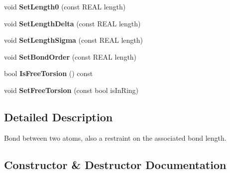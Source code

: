 \begin{DoxyCompactItemize}
void {\bfseries Set\+Length0} (const R\+E\+AL length)
\item 
\mbox{\label{class_obj_cryst_1_1_mol_bond_a42e9a07e2383dcfdcb5b7f0728be726f}} 
void {\bfseries Set\+Length\+Delta} (const R\+E\+AL length)
\item 
\mbox{\label{class_obj_cryst_1_1_mol_bond_ab96f037ddc070774b0cb9665e4e1b751}} 
void {\bfseries Set\+Length\+Sigma} (const R\+E\+AL length)
\item 
\mbox{\label{class_obj_cryst_1_1_mol_bond_a1050f7fc227c9a925d8f98c01e2e1cc9}} 
void {\bfseries Set\+Bond\+Order} (const R\+E\+AL length)
\item 
\mbox{\label{class_obj_cryst_1_1_mol_bond_ac6744cb100d117d8065bf798741a7ce4}} 
bool {\bfseries Is\+Free\+Torsion} () const
\item 
\mbox{\label{class_obj_cryst_1_1_mol_bond_aab0b94a8e27c34d748f4cf7cd0060431}} 
void {\bfseries Set\+Free\+Torsion} (const bool is\+In\+Ring)
\end{DoxyCompactItemize}


\subsection{Detailed Description}
Bond between two atoms, also a restraint on the associated bond length. 

\subsection{Constructor \& Destructor Documentation}
\mbox{\label{class_obj_cryst_1_1_mol_bond_aa5eb1a8ba4e34da2516bfc24af4fabec}} 
